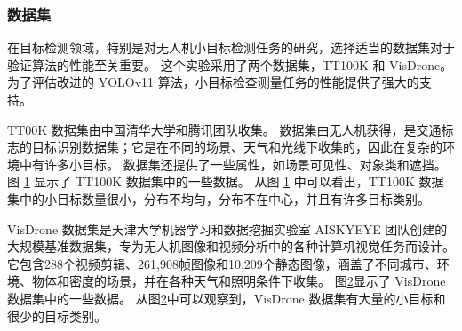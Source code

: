\subsubsection{数据集}

在目标检测领域，特别是对无人机小目标检测任务的研究，选择适当的数据集对于验证算法的性能至关重要。
这个实验采用了两个数据集，TT100K 和 VisDrone。
为了评估改进的 YOLOv11 算法，小目标检查测量任务的性能提供了强大的支持。

TT00K 数据集由中国清华大学和腾讯团队收集。
数据集由无人机获得，是交通标志的目标识别数据集；它是在不同的场景、天气和光线下收集的，因此在复杂的环境中有许多小目标。
数据集还提供了一些属性，如场景可见性、对象类和遮挡。
图 \ref{fig:tt100k_figure} 显示了 TT100K 数据集中的一些数据。
从图 \ref{fig:tt100k_figure} 中可以看出，TT100K 数据集中的小目标数量很小，分布不均匀，分布不在中心，并且有许多目标类别。

\begin{figure}[htbp]
    \centering
    \captionsetup{font=footnotesize}
    \label{fig:tt100k_figure}
\end{figure}

VisDrone 数据集是天津大学机器学习和数据挖掘实验室 AISKYEYE 团队创建的大规模基准数据集，专为无人机图像和视频分析中的各种计算机视觉任务而设计。
它包含288个视频剪辑、261,908帧图像和10,209个静态图像，涵盖了不同城市、环境、物体和密度的场景，并在各种天气和照明条件下收集。
图\ref{fig:vd_figure}显示了 VisDrone 数据集中的一些数据。
从图\ref{fig:vd_figure}中可以观察到，VisDrone 数据集有大量的小目标和很少的目标类别。

\begin{figure}[htbp]
    \centering
    \captionsetup{font=footnotesize}
    \label{fig:vd_figure}
\end{figure}

